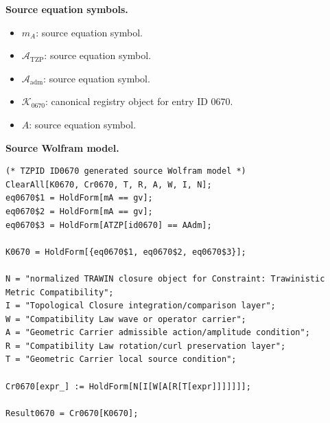 \begin{minipage}[t]{0.49\linewidth}
\begingroup
\small
\raggedright
\textbf{Source equation symbols.}\par
\begin{itemize}[leftmargin=1.35em,itemsep=1pt,topsep=1pt,parsep=0pt]
    \item $m_A$: source equation symbol.
    \item $\mathcal{A}_{\mathrm{TZP}}$: source equation symbol.
    \item $\mathcal{A}_{\mathrm{adm}}$: source equation symbol.
    \item $\mathcal{K}_{0670}$: canonical registry object for entry ID 0670.
    \item $A$: source equation symbol.
\end{itemize}
\endgroup
\end{minipage}\hfill
\begin{minipage}[t]{0.47\linewidth}
\begingroup
\scriptsize
\raggedright
\textbf{Source Wolfram model.}\par
\begin{Verbatim}[fontsize=\tiny,breaklines=true,breakanywhere=true]
(* TZPID ID0670 generated source Wolfram model *)
ClearAll[K0670, Cr0670, T, R, A, W, I, N];
eq0670$1 = HoldForm[mA == gv];
eq0670$2 = HoldForm[mA == gv];
eq0670$3 = HoldForm[ATZP[id0670] == AAdm];

K0670 = HoldForm[{eq0670$1, eq0670$2, eq0670$3}];

N = "normalized TRAWIN closure object for Constraint: Trawinistic Metric Compatibility";
I = "Topological Closure integration/comparison layer";
W = "Compatibility Law wave or operator carrier";
A = "Geometric Carrier admissible action/amplitude condition";
R = "Compatibility Law rotation/curl preservation layer";
T = "Geometric Carrier local source condition";

Cr0670[expr_] := HoldForm[N[I[W[A[R[T[expr]]]]]]];

Result0670 = Cr0670[K0670];
\end{Verbatim}
\endgroup
\end{minipage}

